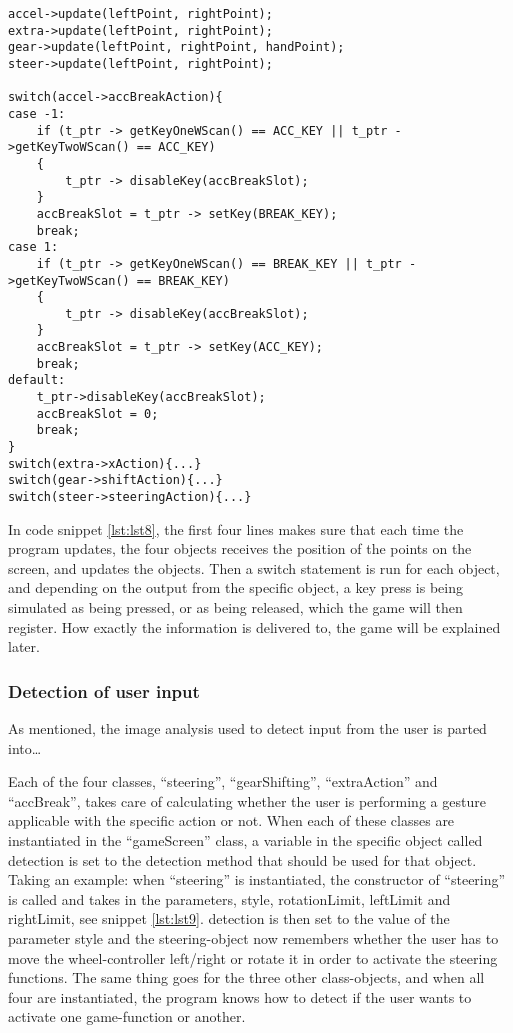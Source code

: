 \begin{lstlisting}[caption=Update, label=lst:lst8]
accel->update(leftPoint, rightPoint);
extra->update(leftPoint, rightPoint);
gear->update(leftPoint, rightPoint, handPoint);
steer->update(leftPoint, rightPoint);

switch(accel->accBreakAction){
case -1:
    if (t_ptr -> getKeyOneWScan() == ACC_KEY || t_ptr ->getKeyTwoWScan() == ACC_KEY)
    {
        t_ptr -> disableKey(accBreakSlot);
    }
    accBreakSlot = t_ptr -> setKey(BREAK_KEY);
    break;
case 1:
    if (t_ptr -> getKeyOneWScan() == BREAK_KEY || t_ptr ->getKeyTwoWScan() == BREAK_KEY)
    {
        t_ptr -> disableKey(accBreakSlot);
    }
    accBreakSlot = t_ptr -> setKey(ACC_KEY);
    break;
default:
    t_ptr->disableKey(accBreakSlot);
    accBreakSlot = 0;
    break;
}
switch(extra->xAction){...}
switch(gear->shiftAction){...}
switch(steer->steeringAction){...}
\end{lstlisting}

In code snippet \ref{lst:lst8}, the first four lines makes sure that each time the program updates, the four objects receives the position of the points on the screen, and updates the objects. 
Then a switch statement is run for each object, and depending on the output from the specific object, a key press is being simulated as being pressed, or as being released, which the game will then register. 
How exactly the information is delivered to, the game will be explained later.


\subsubsection*{Detection of user input}
As mentioned, the image analysis used to detect input from the user is parted into\dots

Each of the four classes, “steering”, “gearShifting”, “extraAction” and “accBreak”, takes care of calculating whether the user is performing a gesture applicable with the specific action or not. 
When each of these classes are instantiated in the “gameScreen” class, a variable in the specific object called detection is set to the detection method that should be used for that object. 
Taking an example: when “steering” is instantiated, the constructor of “steering” is called and takes in the parameters, style, rotationLimit, leftLimit and rightLimit, see snippet \ref{lst:lst9}. 
detection is then set to the value of the parameter style and the steering-object now remembers whether the user has to move the wheel-controller left/right or rotate it in order to activate the steering functions. 
The same thing goes for the three other class-objects, and when all four are instantiated, the program knows how to detect if the user wants to activate one game-function or another.
\bigskip

